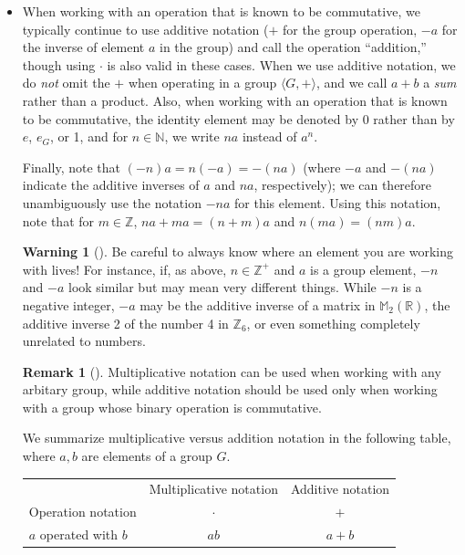 \documentclass[10pt,]{book}
\theoremstyle{plain}
\theoremstyle{definition}
\theoremstyle{definition}
\newtheorem{remark}[theorem]{Remark}
\newtheorem{warning}[theorem]{Warning}
\theoremstyle{definition}
\theoremstyle{definition}
\numberwithin{equation}{section}
\newcommand{\hrulemedium}{\noalign{\hrule height 0.07em}}
\def\Z{\mathbb{Z}}
\def\R{\mathbb{R}}
\def\N{\mathbb{N}}
\def\M{\mathbb{M}}
\begin{document}
\begin{itemize}[label=\textbullet]
\item{}When working with an operation that is known to be commutative, we typically continue to use additive notation (\(+\) for the group operation, \(-a\) for the inverse of element \(a\) in the group) and call the operation ``addition,'' though using \(\cdot\) is also valid in these cases. When we use additive notation, we do \emph{not} omit the \(+\) when operating in a group \(\langle G,+\rangle\), and we call \(a+b\) a \emph{sum} rather than a product. Also, when working with an operation that is known to be commutative, the identity element may be denoted by 0 rather than by \(e\), \(e_G\), or 1, and for \(n\in \N\), we write \(na\) instead of \(a^n\).%
\par
Finally, note that \((-n)a=n(-a)=-(na)\) (where \(-a\) and \(-(na)\) indicate the additive inverses of \(a\) and \(na\), respectively); we can therefore unambiguously use the notation \(-na\) for this element. Using this notation, note that for \(m\in \Z\), \(na+ma=(n+m)a\) and \(n(ma)=(nm)a\).%
\par
\begin{warning}[]\label{warning-7}
Be careful to always know where an element you are working with lives! For instance, if, as above, \(n\in
\Z^+\) and \(a\) is a group element, \(-n\) and \(-a\) look similar but may mean very different things. While \(-n\) is a negative integer, \(-a\) may be the additive inverse of a matrix in \(\M_2(\R)\), the additive inverse 2 of the number 4 in \(\Z_6\), or even something completely unrelated to numbers.%
\end{warning}
%
\par
\begin{remark}[]\label{remark-9}
Multiplicative notation can be used when working with any arbitary group, while additive notation should be used only when working with a group whose binary operation is commutative.%
\end{remark}
%
\par
We summarize multiplicative versus addition notation in the following table, where \(a,b\) are elements of a group \(G\).%
\par
\begin{tabular}{lll}
\multicolumn{1}{c}{}&\multicolumn{1}{c}{Multiplicative notation}&\multicolumn{1}{c}{Additive notation}\tabularnewline\hrulemedium
Operation notation&\multicolumn{1}{c}{\(\cdot\)}&\multicolumn{1}{c}{\(+\)}\tabularnewline[0pt]
\(a\) operated with \(b\)&\multicolumn{1}{c}{\(ab\)}&\multicolumn{1}{c}{\(a+b\)}\tabularnewline[0pt]

\end{tabular}
\end{itemize}
\end{document}
